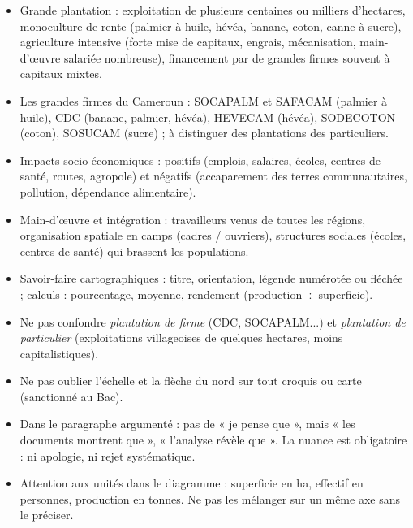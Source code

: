 \documentclass[11pt]{article}
\newcommand{\cle}[1]{{\popxbold\color{popdark}#1}}
\begin{document}
\begin{aretenir}
\begin{itemize}
\item \cle{Grande plantation} : exploitation de plusieurs centaines ou milliers d'hectares, monoculture de rente (palmier à huile, hévéa, banane, coton, canne à sucre), \cle{agriculture intensive} (forte mise de capitaux, engrais, mécanisation, main-d'œuvre salariée nombreuse), financement par de grandes firmes souvent à capitaux mixtes.
\item Les grandes firmes du Cameroun : \cle{SOCAPALM} et \cle{SAFACAM} (palmier à huile), \cle{CDC} (banane, palmier, hévéa), \cle{HEVECAM} (hévéa), \cle{SODECOTON} (coton), \cle{SOSUCAM} (sucre) ; à distinguer des plantations des particuliers.
\item Impacts socio-économiques : positifs (emplois, salaires, écoles, centres de santé, routes, \cle{agropole}) et négatifs (accaparement des terres communautaires, pollution, dépendance alimentaire).
\item Main-d'œuvre et intégration : travailleurs venus de toutes les régions, organisation spatiale en camps (cadres / ouvriers), structures sociales (écoles, centres de santé) qui brassent les populations.
\item Savoir-faire cartographiques : titre, orientation, légende numérotée ou fléchée ; calculs : pourcentage, moyenne, rendement (production $\div$ superficie).
\end{itemize}
\end{aretenir}

\begin{attention}
\begin{itemize}
\item Ne pas confondre \emph{plantation de firme} (CDC, SOCAPALM...) et \emph{plantation de particulier} (exploitations villageoises de quelques hectares, moins capitalistiques).
\item Ne pas oublier l'échelle et la flèche du nord sur tout croquis ou carte (sanctionné au Bac).
\item Dans le paragraphe argumenté : pas de « je pense que », mais « les documents montrent que », « l'analyse révèle que ». La nuance est obligatoire : ni apologie, ni rejet systématique.
\item Attention aux unités dans le diagramme : superficie en ha, effectif en personnes, production en tonnes. Ne pas les mélanger sur un même axe sans le préciser.
\end{itemize}
\end{attention}
\end{document}
